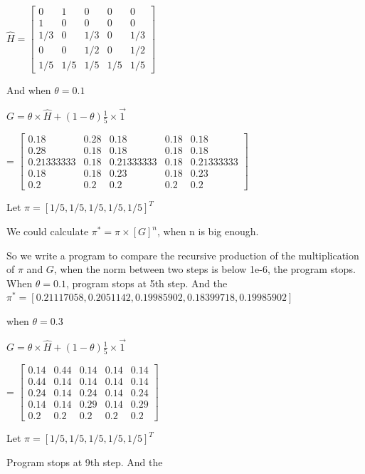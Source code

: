 \documentclass[12pt,a4paper]{article}
\begin{document}
$
\hat{H}=
\begin{bmatrix}
    0 & 1 & 0 & 0 & 0\\
    1 & 0 & 0 & 0 & 0\\
    1/3 & 0 & 1/3 & 0 & 1/3\\
    0 & 0 & 1/2 & 0 & 1/2\\
    1/5 & 1/5 & 1/5 & 1/5 & 1/5
\end{bmatrix}
$

And when $\theta = 0.1$

$
G= \theta \times \hat{H} + (1-\theta) \frac{1}{5} \times \vec{1} 
$

=
$
\begin{bmatrix}
0.18      &  0.28      & 0.18      &  0.18      &  0.18      \\
0.28      &  0.18     &  0.18      &  0.18      &  0.18       \\
0.21333333&  0.18      &  0.21333333&  0.18      &  0.21333333\\
 0.18      & 0.18    &  0.23    &  0.18     &  0.23     \\
0.2       &  0.2       &  0.2       &  0.2       &  0.2
\end{bmatrix}
$

Let $\pi = [1/5,1/5,1/5,1/5,1/5]^{T}$

We could calculate $\pi^{*} = \pi \times [G]^{n}$, when n is big enough. 

So we write a program to compare the recursive production of the multiplication of $\pi$ and $G$, when the norm between two steps is below 1e-6, the program stops. When $\theta = 0.1$, program stops at 5th step. And the $\pi^* = [ 0.21117058,  0.2051142 ,  0.19985902,  0.18399718,  0.19985902]$




when $\theta = 0.3$

$
G= \theta \times \hat{H} + (1-\theta) \frac{1}{5} \times \vec{1} 
$

=
$
\begin{bmatrix}
0.14&  0.44&  0.14&  0.14&  0.14\\
0.44&  0.14&  0.14&  0.14&  0.14\\
0.24&  0.14&  0.24&  0.14&  0.24\\
0.14&  0.14&  0.29&  0.14&  0.29\\
0.2 &  0.2 &  0.2 &  0.2 &  0.2
\end{bmatrix}
$

Let $\pi = [1/5,1/5,1/5,1/5,1/5]^{T}$

Program stops at 9th step. And the 
\end{document}
